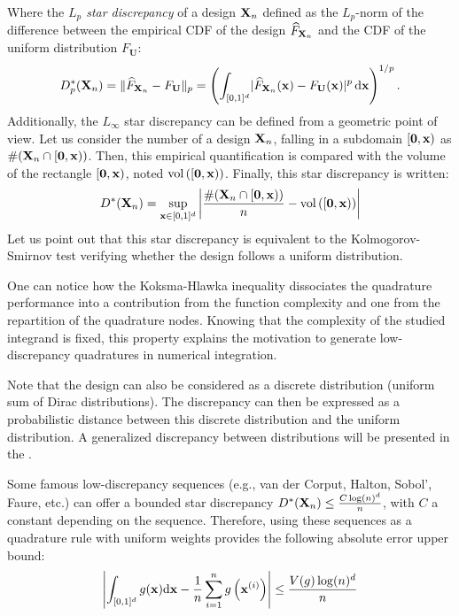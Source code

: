 Where the \textit{$L_p$ star discrepancy} of a design ${\bf X}_n$ defined as the $L_p$-norm of the difference between the empirical CDF of the design $\widehat{F}_{{\bf X}_n}$ and the CDF of the uniform distribution $F_{\textbf{U}}$:  
\begin{equation}
    D^*_p({\bf X}_n) = \lVert \widehat{F}_{{\bf X}_n} - F_{\textbf{U}}\rVert _p = \left(\int_{[0, 1]^d} \lvert\widehat{F}_{{\bf X}_n}({\bf x}) - F_{\textbf{U}}({\bf x})\rvert ^p \, \mathrm{d}{\bf x} \right)^{1/p}.
\end{equation}
Additionally, the $L_\infty$ star discrepancy can be defined from a geometric point of view. 
Let us consider the number of a design ${\bf X}_n$, falling in a subdomain $[\mathbf{0}, {\bf x})$ as $\#({\bf X}_n \cap [\mathbf{0}, {\bf x}))$. 
Then, this empirical quantification is compared with the volume of the rectangle $[\mathbf{0}, {\bf x})$, noted $\mathrm{vol}\left([\mathbf{0}, {\bf x})\right)$.  
Finally, this star discrepancy is written:   
\begin{equation}
    D^*({\bf X}_n) = \sup_{{\bf x} \in [0, 1]^d} \left| \frac{\#({\bf X}_n \cap [\mathbf{0}, {\bf x}))}{n} - \mathrm{vol}\left([\mathbf{0}, {\bf x})\right)\right|
\end{equation}
Let us point out that this star discrepancy is equivalent to the Kolmogorov-Smirnov test verifying whether the design follows a uniform distribution. 

\noindent
One can notice how the Koksma-Hlawka inequality dissociates the quadrature performance into a contribution from the function complexity and one from the repartition of the quadrature nodes. 
Knowing that the complexity of the studied integrand is fixed, this property explains the motivation to generate low-discrepancy quadratures in numerical integration.  

Note that the design can also be considered as a discrete distribution (uniform sum of Dirac distributions).
The discrepancy can then be expressed as a probabilistic distance between this discrete distribution and the uniform distribution. 
A generalized discrepancy between distributions will be presented in the .

Some famous low-discrepancy sequences (e.g., van der Corput, Halton, Sobol', Faure, etc.) can offer a bounded star discrepancy $D^*({\bf X}_n) \leq \frac{C \log(n)^d}{n}$, with $C$ a constant depending on the sequence.
Therefore, using these sequences as a quadrature rule with uniform weights provides the following absolute error upper bound: 
\begin{equation}
    \left| \int_{[0, 1]^d} g({\bf x}) \mathrm{d}{\bf x} - \frac1n \sum_{i=1}^n g\left({\bf x}^{(i)}\right)\right| \leq  \frac{V(g) \log(n)^d}{n}
\end{equation}

